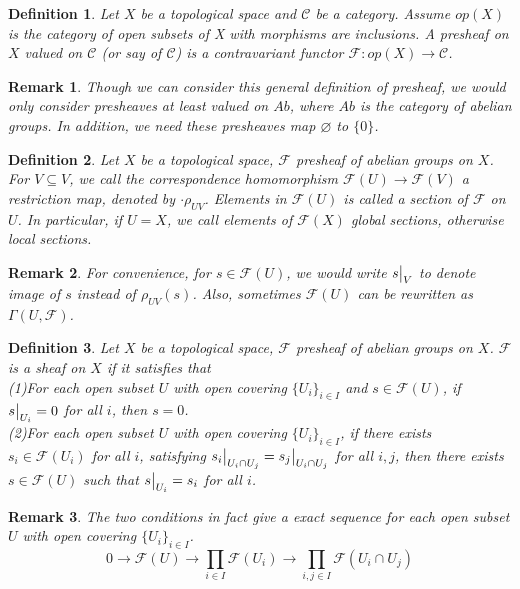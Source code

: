 \documentclass{ctexart}
\newtheorem{definition}{Definition}[section]
\newtheorem{remark}{Remark}[section]
\begin{document}
\begin{definition}
    Let $X$ be a topological space and $\mathcal{C}$ be a category.
    Assume $op(X)$ is the category of open subsets of X with morphisms are inclusions.
    A presheaf on $X$ valued on $\mathcal{C}$ (or say of $\mathcal{C}$) is a contravariant functor $\mathcal{F}: op(X) \longrightarrow \mathcal{C}$.
\end{definition}
\begin{remark}
    Though we can consider this general definition of presheaf, we would only consider presheaves at least valued on $Ab$,
    where $Ab$ is the category of abelian groups.
    In addition, we need these presheaves map $\varnothing$ to $\{0\}$.
\end{remark}
\begin{definition}
    Let $X$ be a topological space, $\mathcal{F}$ presheaf of abelian groups on $X$.
    For $V \subseteq V$, we call the correspondence homomorphism $\mathcal{F}(U) \longrightarrow \mathcal{F}(V)$ a restriction map, denoted by $\cdot \rho_{UV}$.
    Elements in $\mathcal{F}(U)$ is called a section of $\mathcal{F}$ on $U$.
    In particular, if $U = X$, we call elements of $\mathcal{F}(X)$ global sections, otherwise local sections.
\end{definition}
\begin{remark}
    For convenience, for $s\in \mathcal{F}(U)$, we would write $s\big{|}_V$ to denote image of $s$ instead of $\rho_{UV}(s)$.
    Also, sometimes $\mathcal{F}(U)$ can be rewritten as $\Gamma(U, \mathcal{F})$.
\end{remark}
\begin{definition}
    Let $X$ be a topological space, $\mathcal{F}$ presheaf of abelian groups on $X$.
    $\mathcal{F}$ is a sheaf on $X$ if it satisfies that \\
    (1)For each open subset $U$ with open covering $\{U_{i}\}_{i\in I}$ and $s\in \mathcal{F}(U)$, 
    if $s\big{|}_{U_{i}} = 0$ for all $i$, then $s = 0$. \\
    (2)For each open subset $U$ with open covering $\{U_{i}\}_{i\in I}$,
    if there exists $s_{i}\in \mathcal{F}(U_{i})$ for all $i$, satisfying $s_{i}\big{|}_{U_{i} \cap U_{j}} = s_{j}\big{|}_{U_{i} \cap U_{j}}$ for all $i,j$,
    then there exists $s\in \mathcal{F}(U)$ such that $s\big{|}_{U_{i}} = s_{i}$ for all $i$.
\end{definition}
\begin{remark}
    The two conditions in fact give a exact sequence for each open subset $U$ with open covering $\{U_{i}\}_{i\in I}$.
    \begin{equation*}
        0 \longrightarrow \mathcal{F}(U) \longrightarrow \prod_{i\in I} \mathcal{F}(U_{i}) \longrightarrow \prod_{i,j\in I} \mathcal{F}(U_{i} \cap U_{j})
    \end{equation*}
\end{remark}
\end{document}
